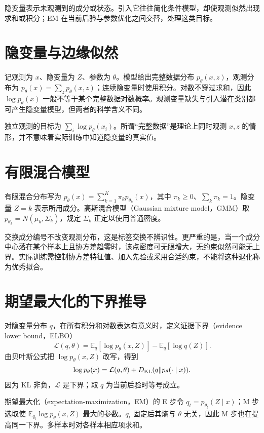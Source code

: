 \documentclass[UTF8,12pt,a4paper,fontset=fandol]{ctexbook}
\begin{document}
隐变量表示未观测到的成分或状态。引入它往往简化条件模型，却使观测似然出现求和或积分；EM 在当前后验与参数优化之间交替，处理这类目标。

\section{隐变量与边缘似然}

记观测为 $x$、隐变量为 $Z$、参数为 $\theta$。模型给出完整数据分布 $p_\theta(x,z)$，观测分布为 $p_\theta(x)=\sum_zp_\theta(x,z)$；连续隐变量时使用积分。对数不穿过求和，因此 $\log p_\theta(x)$ 一般不等于某个完整数据对数概率。观测变量缺失与引入潜在类别都可产生隐变量模型，但两者的科学含义不同。

独立观测的目标为 $\sum_i\log p_\theta(x_i)$。所谓“完整数据”是理论上同时观测 $x,z$ 的情形，并不意味着实际训练中知道隐变量的真实值。

\section{有限混合模型}

有限混合分布写为 $p_\theta(x)=\sum_{k=1}^K\pi_kp_{\theta_k}(x)$，其中 $\pi_k\geq0$、$\sum_k\pi_k=1$。隐变量 $Z=k$ 表示所用成分。高斯混合模型（Gaussian mixture model，GMM）取 $p_{\theta_k}=N(\mu_k,\Sigma_k)$，规定 $\Sigma_k$ 正定以使用普通密度。

交换成分编号不改变观测分布，这是标签交换不辨识性。更严重的是，当一个成分中心落在某个样本上且协方差趋零时，该点密度可无限增大，无约束似然可能无上界。实际训练需控制协方差特征值、加入先验或采用合适约束，不能将这种退化称为优秀拟合。

\section{期望最大化的下界推导}

对隐变量分布 $q$，在所有积分和对数表达有意义时，定义证据下界（evidence lower bound，ELBO）
\begin{equation}
 \mathcal L(q,\theta)=\mathbb E_q[\log p_\theta(x,Z)]-\mathbb E_q[\log q(Z)].
 \label{eq:ml-elbo}
\end{equation}
由贝叶斯公式把 $\log p_\theta(x,Z)$ 改写，得到
\[
 \log p_\theta(x)=\mathcal L(q,\theta)
 +D_{\rm KL}(q\Vert p_\theta(\cdot\mid x)).
\]
因为 KL 非负，$\mathcal L$ 是下界；取 $q$ 为当前后验时等号成立。

期望最大化（expectation-maximization，EM）的 E 步令 $q_t=p_{\theta_t}(Z\mid x)$；M 步选取使 $\mathbb E_{q_t}\log p_\theta(x,Z)$ 最大的参数。$q_t$ 固定后其熵与 $\theta$ 无关，因此 M 步也在提高同一下界。多样本时对各样本相应项求和。
\end{document}

